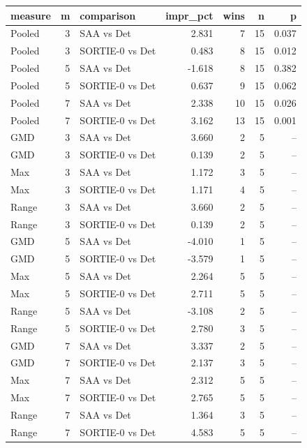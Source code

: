 \begin{tabular}{lrlrrrr}
\toprule
measure & m & comparison & impr\_pct & wins & n & p \\
\midrule
Pooled & 3 & SAA vs Det & 2.831 & 7 & 15 & 0.037 \\
Pooled & 3 & SORTIE-0 vs Det & 0.483 & 8 & 15 & 0.012 \\
Pooled & 5 & SAA vs Det & -1.618 & 8 & 15 & 0.382 \\
Pooled & 5 & SORTIE-0 vs Det & 0.637 & 9 & 15 & 0.062 \\
Pooled & 7 & SAA vs Det & 2.338 & 10 & 15 & 0.026 \\
Pooled & 7 & SORTIE-0 vs Det & 3.162 & 13 & 15 & 0.001 \\
GMD & 3 & SAA vs Det & 3.660 & 2 & 5 & -- \\
GMD & 3 & SORTIE-0 vs Det & 0.139 & 2 & 5 & -- \\
Max & 3 & SAA vs Det & 1.172 & 3 & 5 & -- \\
Max & 3 & SORTIE-0 vs Det & 1.171 & 4 & 5 & -- \\
Range & 3 & SAA vs Det & 3.660 & 2 & 5 & -- \\
Range & 3 & SORTIE-0 vs Det & 0.139 & 2 & 5 & -- \\
GMD & 5 & SAA vs Det & -4.010 & 1 & 5 & -- \\
GMD & 5 & SORTIE-0 vs Det & -3.579 & 1 & 5 & -- \\
Max & 5 & SAA vs Det & 2.264 & 5 & 5 & -- \\
Max & 5 & SORTIE-0 vs Det & 2.711 & 5 & 5 & -- \\
Range & 5 & SAA vs Det & -3.108 & 2 & 5 & -- \\
Range & 5 & SORTIE-0 vs Det & 2.780 & 3 & 5 & -- \\
GMD & 7 & SAA vs Det & 3.337 & 2 & 5 & -- \\
GMD & 7 & SORTIE-0 vs Det & 2.137 & 3 & 5 & -- \\
Max & 7 & SAA vs Det & 2.312 & 5 & 5 & -- \\
Max & 7 & SORTIE-0 vs Det & 2.765 & 5 & 5 & -- \\
Range & 7 & SAA vs Det & 1.364 & 3 & 5 & -- \\
Range & 7 & SORTIE-0 vs Det & 4.583 & 5 & 5 & -- \\
\bottomrule
\end{tabular}
